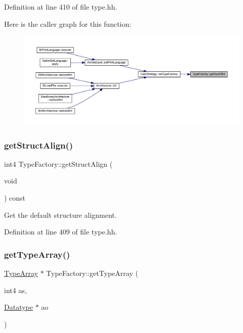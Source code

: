 Definition at line 410 of file type.\+hh.

Here is the caller graph for this function\+:
\nopagebreak
\begin{figure}[H]
\begin{center}
\leavevmode
\includegraphics[width=350pt]{class_type_factory_a8a7d719707e81a56b9871272296e0893_icgraph}
\end{center}
\end{figure}
\mbox{\label{class_type_factory_a12e578b99d47a8d6f46edeb1a3f79db4}} 
\subsubsection{\texorpdfstring{getStructAlign()}{getStructAlign()}}
{\footnotesize\ttfamily int4 Type\+Factory\+::get\+Struct\+Align (\begin{DoxyParamCaption}\item[{void}]{ }\end{DoxyParamCaption}) const\hspace{0.3cm}{\ttfamily [inline]}}



Get the default structure alignment. 



Definition at line 409 of file type.\+hh.

\mbox{\label{class_type_factory_ad1efe412493c66b6072ae0def3b53004}} 
\subsubsection{\texorpdfstring{getTypeArray()}{getTypeArray()}}
{\footnotesize\ttfamily \mbox{\hyperlink{class_type_array}{Type\+Array}} $\ast$ Type\+Factory\+::get\+Type\+Array (\begin{DoxyParamCaption}\item[{int4}]{as,  }\item[{\mbox{\hyperlink{class_datatype}{Datatype}} $\ast$}]{ao }\end{DoxyParamCaption})}



